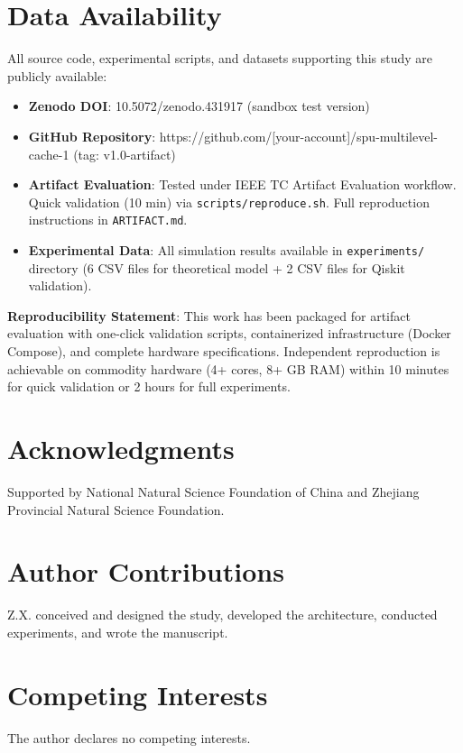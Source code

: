 \documentclass[12pt,a4paper]{article}
\theoremstyle{definition}
\begin{document}
\section*{Data Availability}
All source code, experimental scripts, and datasets supporting this study are publicly available:
\begin{itemize}
    \item \textbf{Zenodo DOI}: 10.5072/zenodo.431917 (sandbox test version)
    \item \textbf{GitHub Repository}: https://github.com/[your-account]/spu-multilevel-cache-1 (tag: v1.0-artifact)
    \item \textbf{Artifact Evaluation}: Tested under IEEE TC Artifact Evaluation workflow. Quick validation (10 min) via \texttt{scripts/reproduce.sh}. Full reproduction instructions in \texttt{ARTIFACT.md}.
    \item \textbf{Experimental Data}: All simulation results available in \texttt{experiments/} directory (6 CSV files for theoretical model + 2 CSV files for Qiskit validation).
\end{itemize}

\noindent\textbf{Reproducibility Statement}: This work has been packaged for artifact evaluation with one-click validation scripts, containerized infrastructure (Docker Compose), and complete hardware specifications. Independent reproduction is achievable on commodity hardware (4+ cores, 8+ GB RAM) within 10 minutes for quick validation or 2 hours for full experiments.

\section*{Acknowledgments}
Supported by National Natural Science Foundation of China and Zhejiang Provincial Natural Science Foundation.

\section*{Author Contributions}
Z.X. conceived and designed the study, developed the architecture, conducted experiments, and wrote the manuscript.

\section*{Competing Interests}
The author declares no competing interests.
\end{document}
